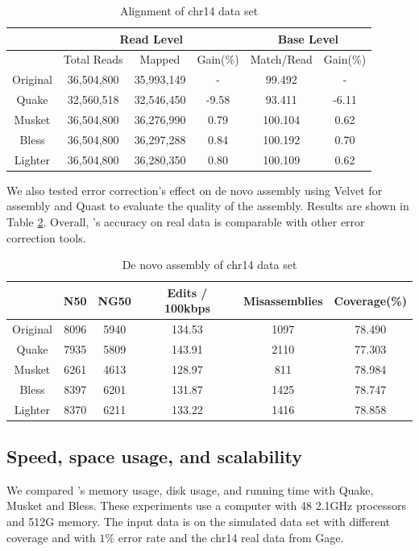 \documentclass[10pt]{article}
\begin{document}
\begin{table}
\centering
\begin{tabular}{|c|c|c|c||c|c|}\hline
  & \multicolumn{3}{|c||}{Read Level} & \multicolumn{2}{|c|}{Base Level} \\ \hline
  & Total Reads  & Mapped  &Gain(\%) &	Match/Read	& Gain(\%) \\ \hline
Original &	36,504,800	& 35,993,149	&- 		&	99.492	& - \\ \hline
Quake 	&	32,560,518	& 32,546,450	& -9.58 &	93.411	& -6.11 \\ \hline
Musket 	&	36,504,800 	&	36,276,990	& 0.79	& 100.104	& 0.62 \\ \hline
Bless 	&	36,504,800	&36,297,288	& 0.84	& 100.192	&	0.70 \\ \hline
Lighter	&   36,504,800	&36,280,350	& 0.80	& 100.109	& 0.62 \\ \hline
\end{tabular}
\caption{Alignment of chr14 data set\label{table:chr14_alignment}}
\end{table}

We also tested error correction's effect on de novo assembly using Velvet for assembly and Quast to evaluate the quality of the assembly.  Results are shown in Table \ref{table:chr14_assembly}. Overall, \tool's accuracy on real data is comparable with other error correction tools.

\begin{table}
\centering
\begin{tabular}{|c|c|c|c|c|c|} \hline
	   & N50 &	NG50	& Edits / 100kbps &	Misassemblies	& Coverage(\%) \\ \hline
Original &	8096 &5940	&134.53	&1097	&78.490 \\ \hline
Quake	& 7935	&5809	&143.91	&2110	&77.303 \\ \hline
Musket	& 6261	&4613	&128.97	&811	&78.984 \\ \hline
Bless	& 8397	&6201	&131.87 &1425	&78.747 \\ \hline
Lighter	& 8370	&6211	&133.22	&1416	&78.858 \\ \hline
\end{tabular}
\caption{De novo assembly of chr14 data set\label{table:chr14_assembly}}
\end{table}

\subsection*{Speed, space usage, and scalability}
We compared \tool's memory usage, disk usage, and running time with Quake, Musket and Bless.  These experiments use a computer with 48 2.1GHz processors and 512G memory.
The input data is  on the simulated data set with different coverage and with $1\%$ error rate and the chr14 real data from Gage.  
\end{document}
